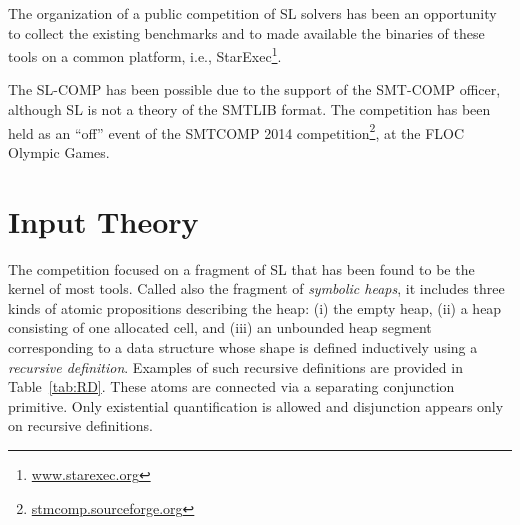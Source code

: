 \documentclass{llncs}
\begin{document}
The organization of a public competition of SL solvers has been an opportunity 
to collect the existing benchmarks and  
to made available the binaries of these tools on a common platform, i.e., StarExec\footnote{\url{www.starexec.org}}.

The SL-COMP has been possible due to the support of the SMT-COMP officer, 
although SL is not a theory of the SMTLIB format.
The competition has been held as an ``off'' event
of the SMTCOMP 2014 competition\footnote{\url{stmcomp.sourceforge.org}}, at the FLOC Olympic Games.


\section{Input Theory}

The competition focused on a fragment of SL that has been found to be the kernel of most tools.
Called also the fragment of \emph{symbolic heaps}, 
it includes three kinds of atomic propositions describing the heap:
(i) the empty heap, 
(ii) a heap consisting of one allocated cell, and
(iii) an unbounded heap segment corresponding to a data structure whose shape is defined inductively using a \emph{recursive definition}. 
Examples of such recursive definitions are provided in Table~\ref{tab:RD}.
These atoms are connected via a separating conjunction primitive. 
Only existential quantification is allowed and 
disjunction appears only on recursive definitions. 

\end{document}
